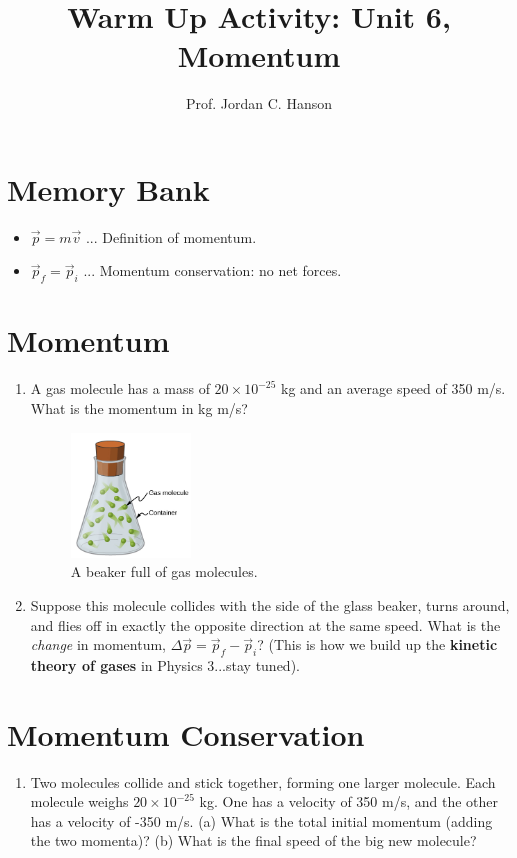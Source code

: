 \documentclass{article}
\begin{document}
\title{Warm Up Activity: Unit 6, Momentum}
\author{Prof. Jordan C. Hanson}

\maketitle

\section{Memory Bank}

\begin{itemize}
\item $\vec{p} = m \vec{v}$ ... Definition of momentum.
\item $\vec{p}_f = \vec{p}_i$ ... Momentum conservation: no net forces.
\end{itemize}

\section{Momentum}

\begin{enumerate}
\item A gas molecule has a mass of $20 \times 10^{-25}$ kg and an average speed of 350 m/s.  What is the momentum in kg m/s? \\ \vspace{1cm}
\begin{figure}[ht]
\centering
\includegraphics[width=0.3\textwidth]{gas.png}
\caption{\label{fig:gas} A beaker full of gas molecules.}
\end{figure}
\item Suppose this molecule collides with the side of the glass beaker, turns around, and flies off in exactly the opposite direction at the same speed.  What is the \textit{change} in momentum, $\Delta \vec{p} = \vec{p}_f - \vec{p}_i$?  (This is how we build up the \textbf{kinetic theory of gases} in Physics 3...stay tuned). \\ \vspace{1cm}
\end{enumerate}

\section{Momentum Conservation}
\begin{enumerate}
\item Two molecules collide and stick together, forming one larger molecule.  Each molecule weighs $20 \times 10^{-25}$ kg.  One has a velocity of 350 m/s, and the other has a velocity of -350 m/s.  (a) What is the total initial momentum (adding the two momenta)? (b) What is the final speed of the big new molecule?
\end{enumerate}
\end{document}

